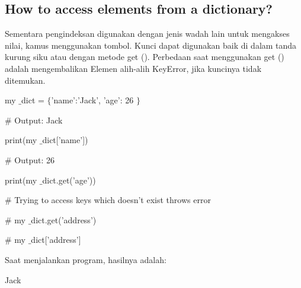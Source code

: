 \documentclass[a4paper,12pt]{report}
\begin{document}
\subsection*{How to access elements from a dictionary?}
 \par
\noindent 
Sementara pengindeksan digunakan dengan jenis wadah lain untuk mengakses nilai, kamus menggunakan tombol. Kunci dapat digunakan baik di dalam tanda kurung siku atau dengan metode get (). Perbedaan saat menggunakan get () adalah mengembalikan Elemen alih-alih KeyError, jika kuncinya tidak ditemukan. \par
\noindent 
 \hspace*{0.5in} my $  \_  $dict =  $  \{  $'name':'Jack', 'age': 26 $  \}  $ \par
\noindent 
 \hspace*{0.5in}  $  \#  $ Output: Jack \par
\noindent 
 \hspace*{0.5in} print(my $  \_  $dict['name']) \par
\noindent 
 \hspace*{0.5in}  $  \#  $ Output: 26 \par
\noindent 
 \hspace*{0.5in} print(my $  \_  $dict.get('age')) \par
\noindent 
 \hspace*{0.5in}  $  \#  $ Trying to access keys which doesn't exist throws error \par
\noindent 
 \hspace*{0.5in}  $  \#  $ my $  \_  $dict.get('address') \par
\noindent 
 \hspace*{0.5in}  $  \#  $ my $  \_  $dict['address'] \par
\noindent 
Saat menjalankan program, hasilnya adalah: \par
\noindent 
{\fontsize{11pt}{11pt}\selectfont Jack} \par
\noindent 
{\fontsize{11pt}{11pt}} \par
\vspace{12pt}
\noindent 
\end{document}
